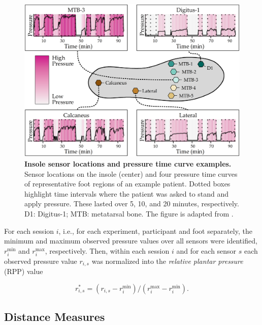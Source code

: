\documentclass[
  oneside]{book}
\begin{document}
\begin{figure}[htb]

{\centering \includegraphics[width=1\linewidth]{figures/07-kontur} 

}

\caption{\textbf{Insole sensor locations and pressure time curve examples.} Sensor locations on the insole (center) and four pressure time curves of representative foot regions of an example patient. Dotted boxes highlight time intervals where the patient was asked to stand and apply pressure. These lasted over 5, 10, and 20 minutes, respectively. D1: Digitus-1; MTB: metatarsal bone. The figure is adapted from \autocite{Niemann:PONE2016}.}\label{fig:07-kontur}
\end{figure}

For each session \(i\), i.e., for each experiment, participant and foot separately, the minimum and maximum observed pressure values over all sensors were identified, \(r_{i}^{\text{min}}\) and \(r_{i}^{\text{max}}\), respectively.
Then, within each session \(i\) and for each sensor \(s\) each observed pressure value \(r_{i,s}\) was normalized into the \emph{relative plantar pressure} (RPP) value

\begin{equation}
r^*_{i,s}=(r_{i,s}-r_{i}^{\text{min}})/(r_{i}^{\text{max}}-r_{i}^{\text{min}}).
\label{eq:rpp}
\end{equation}

\hypertarget{diabfoot-approach-similarity-measures}{%
\subsection{Distance Measures}\label{diabfoot-approach-similarity-measures}}
\end{document}
